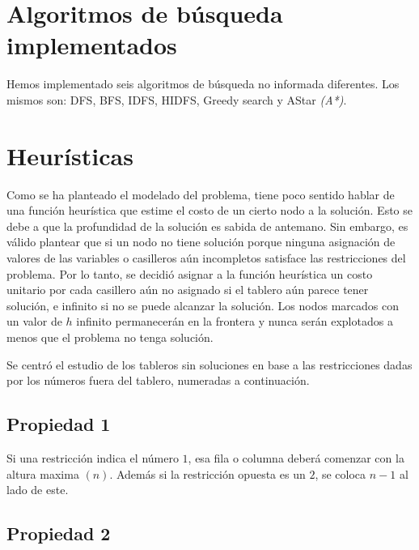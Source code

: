 \documentclass[%
    final,
    reprint,
    notitlepage,
    narroweqnarray,
    inline,
    twoside,
    invited
    ]{ieee}
\begin{document}
\section{Algoritmos de búsqueda implementados}

\par Hemos implementado seis algoritmos de búsqueda no informada diferentes. Los mismos son: DFS, BFS, IDFS, HIDFS, Greedy search y AStar \textit{(A*)}.

\section{Heurísticas}

\par Como se ha planteado el modelado del problema, tiene poco sentido hablar de una función heurística que estime el costo de un cierto nodo 
a la solución. Esto se debe a que la profundidad de la solución es sabida de antemano. Sin embargo, es válido plantear que si un nodo 
no tiene solución porque ninguna asignación de valores de las variables o casilleros aún incompletos satisface las restricciones del problema. Por lo tanto, 
se decidió asignar a la función heurística un costo unitario por cada casillero aún no asignado si el tablero aún parece tener solución, e infinito 
si no se puede alcanzar la solución. Los nodos marcados con un valor de $h$ infinito permanecerán en la frontera y nunca serán explotados a menos que 
el problema no tenga solución.
\par Se centró el estudio de los tableros sin soluciones en base a las restricciones dadas por los números fuera del tablero, numeradas a continuación.\\

\subsection{Propiedad 1}

\par Si una restricción indica el número $1$, esa fila o columna deberá comenzar con la altura maxima $(n)$. Además si la restricción opuesta es un $2$, se coloca $n-1$ al lado de este.

\subsection{Propiedad 2}
\end{document}

